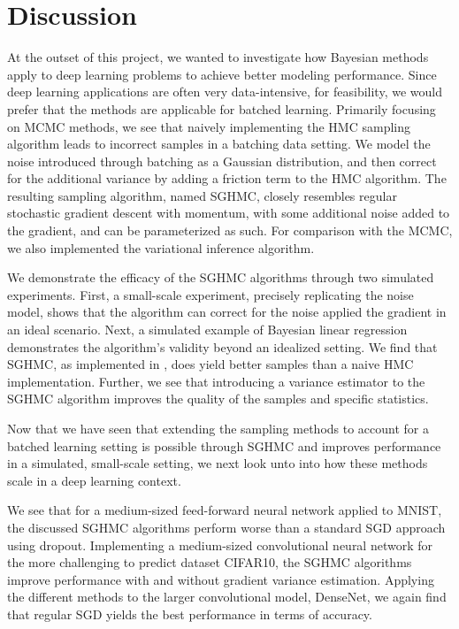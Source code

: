 \chapter{Discussion}

At the outset of this project, we wanted to investigate how  Bayesian methods apply to deep learning problems to achieve better modeling performance.
Since deep learning applications are often very data-intensive, for feasibility, we would prefer that the methods are applicable for batched learning. 
Primarily focusing on MCMC methods, we see that naively implementing the HMC sampling algorithm leads to incorrect samples in a batching data setting.
We model the noise introduced through batching as a Gaussian distribution, and then correct for the additional variance by adding a friction term to the HMC algorithm. 
The resulting sampling algorithm, named SGHMC, closely resembles regular stochastic gradient descent with momentum, with some additional noise added to the gradient, and can be parameterized as such.
For comparison with the MCMC, we also implemented the variational inference algorithm.

We demonstrate the efficacy of the SGHMC algorithms through two simulated experiments. 
First, a small-scale experiment, precisely replicating the noise model, shows that the algorithm can correct for the noise applied the gradient in an ideal scenario. 
Next, a simulated example of Bayesian linear regression demonstrates the algorithm's validity beyond an idealized setting.  
We find that SGHMC, as implemented in \autocite{chen_stochastic_2014}, does yield better samples than a naive HMC implementation. 
Further, we see that introducing a variance estimator to the SGHMC algorithm improves the quality of the samples and specific statistics. 

Now that we have seen that extending the sampling methods to account for a batched learning setting is possible through SGHMC and improves performance in a simulated, small-scale setting, we next look unto into how these methods scale in a deep learning context.

We see that for a medium-sized feed-forward neural network applied to MNIST, the discussed SGHMC algorithms perform worse than a standard SGD approach using dropout. 
Implementing a medium-sized convolutional neural network for the more challenging to predict dataset CIFAR10, the SGHMC algorithms improve performance with and without gradient variance estimation. 
Applying the different methods to the larger convolutional model, DenseNet, we again find that regular SGD yields the best performance in terms of accuracy. 

